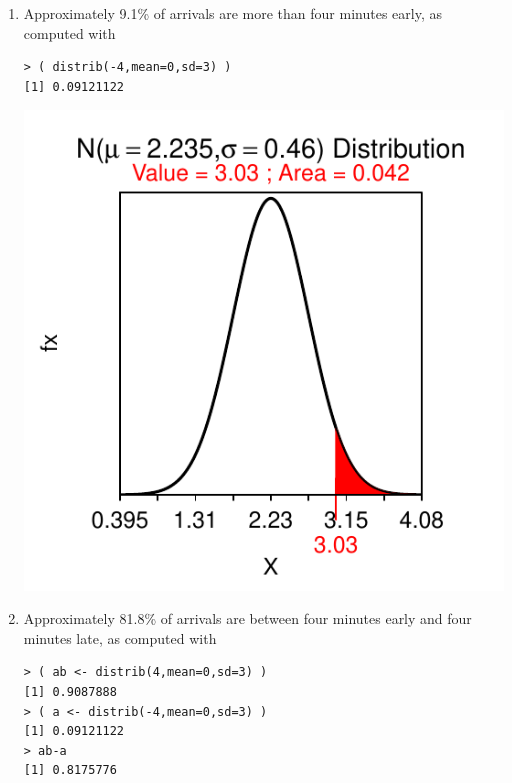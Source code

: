 \documentclass[10pt,openany]{book}\usepackage[]{graphicx}\usepackage[]{color}
\makeatletter
\newenvironment{kframe}{%
 \def\at@end@of@kframe{}%
 \ifinner\ifhmode%
  \def\at@end@of@kframe{\end{minipage}}%
  \begin{minipage}{\columnwidth}%
 \fi\fi%
 \def\FrameCommand##1{\hskip\@totalleftmargin \hskip-\fboxsep
 \colorbox{shadecolor}{##1}\hskip-\fboxsep
     \hskip-\linewidth \hskip-\@totalleftmargin \hskip\columnwidth}%
 \MakeFramed {\advance\hsize-\width
   \@totalleftmargin\z@ \linewidth\hsize
   \@setminipage}}%
 {\par\unskip\endMakeFramed%
 \at@end@of@kframe}
\newenvironment{knitrout}{}{} %
\makeatother
\begin{document}
\begin{itemize}
\begin{enumerate}
\begin{knitrout}
{}



\end{knitrout}
      \item Approximately 9.1\% of arrivals are more than four minutes early, as computed with
\begin{knitrout}
\color{fgcolor}\begin{kframe}
\begin{verbatim}
> ( distrib(-4,mean=0,sd=3) )
[1] 0.09121122
\end{verbatim}
\end{kframe}

{\centering \includegraphics[width=.4\linewidth]{Figs/unnamed-chunk-241-1} 

}



\end{knitrout}
      \item Approximately 81.8\% of arrivals are between four minutes early and four minutes late, as computed with
\begin{knitrout}
\color{fgcolor}\begin{kframe}
\begin{verbatim}
> ( ab <- distrib(4,mean=0,sd=3) )
[1] 0.9087888
> ( a <- distrib(-4,mean=0,sd=3) )
[1] 0.09121122
> ab-a
[1] 0.8175776
\end{verbatim}
\end{kframe}


\end{knitrout}
\end{enumerate}
\end{itemize}
\end{document}
